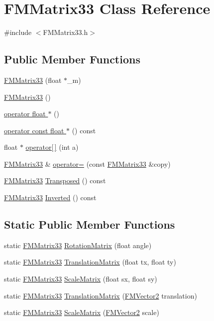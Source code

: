 \hypertarget{classFMMatrix33}{
\section{FMMatrix33 Class Reference}
\label{classFMMatrix33}
}


{\ttfamily \#include $<$FMMatrix33.h$>$}

\subsection*{Public Member Functions}
\begin{DoxyCompactItemize}
\item 
\hyperlink{classFMMatrix33_aaaa2c13f0e797c868ec3042cb9ed48b6}{FMMatrix33} (float $\ast$\_\-m)
\item 
\hyperlink{classFMMatrix33_ace369b9695f0110475ab09200f914aa6}{FMMatrix33} ()
\item 
\hyperlink{classFMMatrix33_a723877ff60d022ec7bb051947a73652b}{operator float $\ast$} ()
\item 
\hyperlink{classFMMatrix33_a0b4c98e78d0a6aff94cd0b9df52b723e}{operator const float $\ast$} () const 
\item 
float $\ast$ \hyperlink{classFMMatrix33_a17914c286b1df2f8e1727fe9416435e7}{operator\mbox{[}$\,$\mbox{]}} (int a)
\item 
\hyperlink{classFMMatrix33}{FMMatrix33} \& \hyperlink{classFMMatrix33_afd6fe3548530aff2889f606ebfce168c}{operator=} (const \hyperlink{classFMMatrix33}{FMMatrix33} \&copy)
\item 
\hyperlink{classFMMatrix33}{FMMatrix33} \hyperlink{classFMMatrix33_a4a12b1558c937f7972af9156910eb644}{Transposed} () const 
\item 
\hyperlink{classFMMatrix33}{FMMatrix33} \hyperlink{classFMMatrix33_ad14af34a608a0e918e03446382c72213}{Inverted} () const 
\end{DoxyCompactItemize}
\subsection*{Static Public Member Functions}
\begin{DoxyCompactItemize}
\item 
static \hyperlink{classFMMatrix33}{FMMatrix33} \hyperlink{classFMMatrix33_a84c00b4f22e56a11231f75d6686e1f99}{RotationMatrix} (float angle)
\item 
static \hyperlink{classFMMatrix33}{FMMatrix33} \hyperlink{classFMMatrix33_ae95865bc6013e404fcf9ff389213fefe}{TranslationMatrix} (float tx, float ty)
\item 
static \hyperlink{classFMMatrix33}{FMMatrix33} \hyperlink{classFMMatrix33_ac574d1782e22ccf8d093661a75b0e77b}{ScaleMatrix} (float sx, float sy)
\item 
static \hyperlink{classFMMatrix33}{FMMatrix33} \hyperlink{classFMMatrix33_a8c3951ad39dd4aa16b82f4baf2e22c2c}{TranslationMatrix} (\hyperlink{classFMVector2}{FMVector2} translation)
\item 
static \hyperlink{classFMMatrix33}{FMMatrix33} \hyperlink{classFMMatrix33_aa8d1703c15367aca1106ed6a20e4cb32}{ScaleMatrix} (\hyperlink{classFMVector2}{FMVector2} scale)
\end{DoxyCompactItemize}
